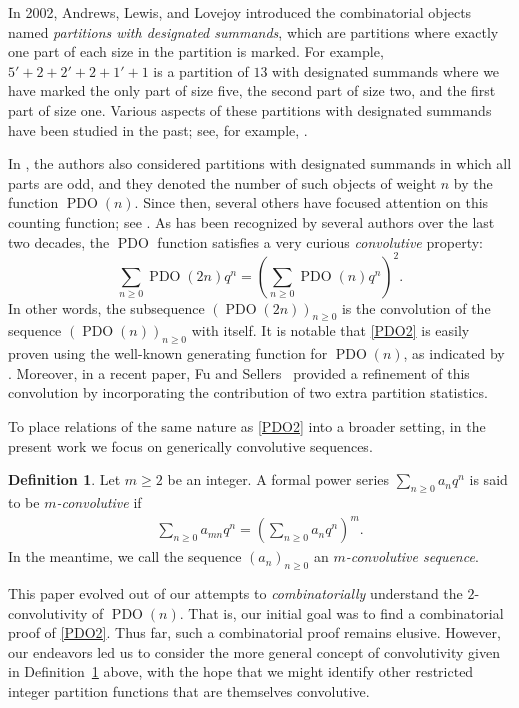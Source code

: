 \documentclass[12pt,reqno]{amsart}
\numberwithin{equation}{section}
\theoremstyle{plain}
\theoremstyle{definition}
\newtheorem{definition}[theorem]{Definition}
\theoremstyle{named}
\newcommand{\PDO}{\operatorname{PDO}}
\begin{document}
In 2002, Andrews, Lewis, and Lovejoy \cite{ALL2002} introduced the combinatorial objects named \emph{partitions with designated summands}, which are partitions where exactly one part of each size in the partition is marked. For example, $5'+2+2'+2+1'+1$ is a partition of $13$ with designated summands where we have marked the only part of size five, the second part of size two, and the first part of size one.  Various aspects of these partitions with designated summands have been studied in the past; see, for example, \cite{ALL2002, Chen13, Shen, Xia}.  

In \cite{ALL2002}, the authors also considered partitions with designated summands in which all parts are odd, and they denoted the number of such objects of weight $n$ by the function $\PDO(n)$.  Since then, several others have focused attention on this counting function; see \cite{BO15, ChernSellers, FuSel, Sel2024_INTEGERS}. As has been recognized by several authors over the last two decades, the $\PDO$ function satisfies a very curious \emph{convolutive} property:
\begin{equation} \label{PDO2}
	\sum_{n\ge 0} \PDO(2n)q^n = \left ( \sum_{n\ge 0} \PDO(n)q^n \right )^2.
\end{equation}
In other words, the subsequence $(\PDO(2n))_{n\ge 0}$ is the convolution of the sequence $(\PDO(n))_{n\ge 0}$ with itself.  It is notable that \eqref{PDO2} is easily proven using the well-known generating function for $\PDO(n)$, as indicated by \cite[p.~52, eq.~(1.6) and p.~63, Theorem~21]{ALL2002}. Moreover, in a recent paper, Fu and Sellers~\cite[p.~7, Theorem~3.4]{FuSel} provided a refinement of this convolution by incorporating the contribution of two extra partition statistics.

To place relations of the same nature as \eqref{PDO2} into a broader setting, in the present work we focus on generically convolutive sequences.

\begin{definition}\label{def:mconv}
	Let $m\ge 2$ be an integer. A formal power series $\sum_{n\ge 0} a_n q^n$ is said to be \emph{$m$-convolutive} if
	\begin{align}\label{eq:mconv}
		\sum_{n\ge 0} a_{mn} q^n = \left(\sum_{n\ge 0} a_n q^n\right)^m.
	\end{align}
	In the meantime, we call the sequence $(a_n)_{n\ge 0}$ an \emph{$m$-convolutive sequence}.
\end{definition}

This paper evolved out of our attempts to \emph{combinatorially} understand the $2$-convolutivity of $\PDO(n)$. That is, our initial goal was to find a combinatorial proof of \eqref{PDO2}. Thus far, such a combinatorial proof remains elusive. However, our endeavors led us to consider the more general concept of convolutivity given in Definition~\ref{def:mconv} above, with the hope that we might identify other restricted integer partition functions that are themselves convolutive.
\end{document}

